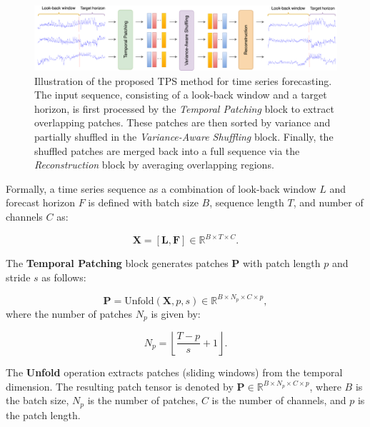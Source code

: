 \begin{figure}[h!]
    \centering
\includegraphics[page=1, width=1.0\textwidth, keepaspectratio]{./images/tsf1.drawio.png}
\caption{Illustration of the proposed TPS method for time series forecasting. The input sequence, consisting of a look-back window and a target horizon, is first processed by the \textit{Temporal Patching} block to extract overlapping patches. These patches are then sorted by variance and partially shuffled in the \textit{Variance-Aware Shuffling} block. Finally, the shuffled patches are merged back into a full sequence via the \textit{Reconstruction} block by averaging overlapping regions.}

    \label{fig:tpstsf}
\end{figure}


Formally, a time series sequence as a combination of look-back window $L$ and forecast horizon $F$ is defined with batch size $B$, sequence length $T$, and number of channels $C$ as:

\begin{equation} \label{eq: concat}
\mathbf{X} = [\mathbf{L}, \mathbf{F}] \in \mathbb{R}^{B \times T \times C}.
\end{equation}


The \textbf{Temporal Patching} block generates patches $\mathbf{P}$ with patch length $p$ and stride $s$ as follows:

\begin{equation} \label{eq: patching}
\mathbf{P} = \text{Unfold}(\mathbf{X}, p, s) \in \mathbb{R}^{B \times N_p \times C \times p},
\end{equation}
where the number of patches $N_p$ is given by:

\begin{equation} 
N_p = \left\lfloor \frac{T - p}{s} + 1 \right\rfloor.
\end{equation}


The \textbf{Unfold} operation extracts patches (sliding windows) from the temporal dimension. The resulting patch tensor is denoted by $\mathbf{P} \in \mathbb{R}^{B \times N_p \times C \times p}$, where $B$ is the batch size, $N_p$ is the number of patches, $C$ is the number of channels, and $p$ is the patch length.

